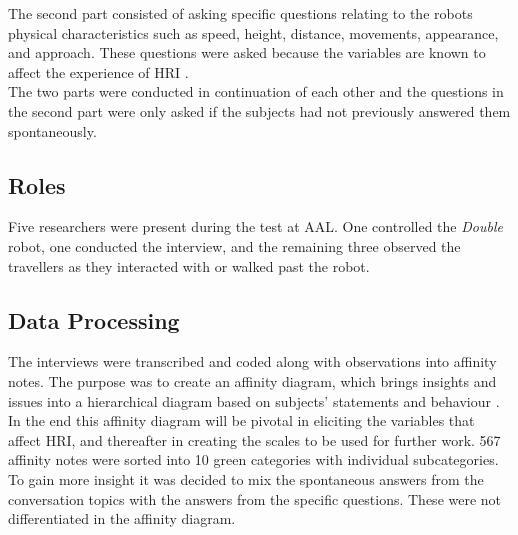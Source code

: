 %
%
The second part consisted of asking specific questions relating to the robots physical characteristics such as speed, height, distance, movements, appearance, and approach. These questions were asked because the variables are known to affect the experience of HRI \cite{PDF:HowMayIServeYou}.\\

The two parts were conducted in continuation of each other and the questions in the second part were only asked if the subjects had not previously answered them spontaneously.
 
\subsection{Roles}
Five researchers were present during the test at AAL. One controlled the \textit{Double} robot, one conducted the interview, and the remaining three observed the travellers as they interacted with or walked past the robot. 

\subsection{Data Processing}
The interviews were transcribed and coded along with observations into affinity notes. The purpose was to create an affinity diagram, which brings insights and issues into a hierarchical diagram based on subjects' statements and behaviour \cite{Wendell2005}. In the end this affinity diagram will be pivotal in eliciting the variables that affect HRI, and thereafter in creating the scales to be used for further work. 
567 affinity notes were sorted into 10 green categories with individual subcategories. To gain more insight it was decided to mix the spontaneous answers from the conversation topics with the answers from the specific questions. These were not differentiated in the affinity diagram.




